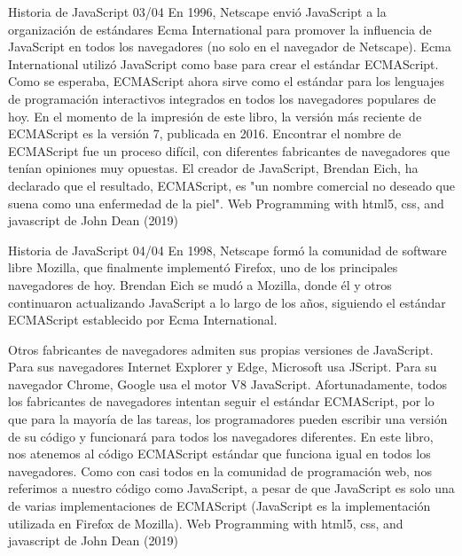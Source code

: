 \begin{frame}{Historia de JavaScript 03/04}
\justifying
En 1996, Netscape envió JavaScript a la organización de estándares Ecma International para promover la influencia de JavaScript en todos los navegadores (no solo en el navegador de Netscape). Ecma International utilizó JavaScript como base para crear el estándar ECMAScript. Como se esperaba, ECMAScript ahora sirve como el estándar para los lenguajes de programación interactivos integrados en todos los navegadores populares de hoy. En el momento de la impresión de este libro, la versión más reciente de ECMAScript es la versión 7, publicada en 2016. Encontrar el nombre de ECMAScript fue un proceso difícil, con diferentes fabricantes de navegadores que tenían opiniones muy opuestas. El creador de JavaScript, Brendan Eich, ha declarado que el resultado, ECMAScript, es "un nombre comercial no deseado que suena como una enfermedad de la piel".
{\tiny Web Programming with html5, css, and javascript de John Dean (2019)}
\end{frame}

\begin{frame}{Historia de JavaScript 04/04}
\justifying
En 1998, Netscape formó la comunidad de software libre Mozilla, que finalmente implementó Firefox, uno de los principales navegadores de hoy. Brendan Eich se mudó a Mozilla, donde él y otros continuaron actualizando JavaScript a lo largo de los años, siguiendo el estándar ECMAScript establecido por Ecma International.

Otros fabricantes de navegadores admiten sus propias versiones de JavaScript. Para sus navegadores Internet Explorer y Edge, Microsoft usa JScript. Para su navegador Chrome, Google usa el motor V8 JavaScript. Afortunadamente, todos los fabricantes de navegadores intentan seguir el estándar ECMAScript, por lo que para la mayoría de las tareas, los programadores pueden escribir una versión de su código y funcionará para todos los navegadores diferentes. En este libro, nos atenemos al código ECMAScript estándar que funciona igual en todos los navegadores. Como con casi todos en la comunidad de programación web, nos referimos a nuestro código como JavaScript, a pesar de que JavaScript es solo una de varias implementaciones de ECMAScript (JavaScript es la implementación utilizada en Firefox de Mozilla).
{\tiny Web Programming with html5, css, and javascript de John Dean (2019)}
\end{frame}

